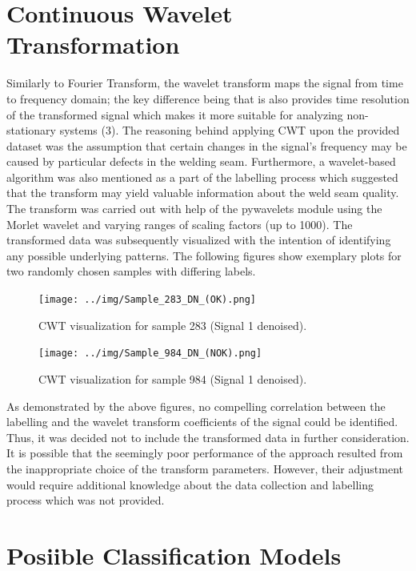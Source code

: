 \documentclass[12pt]{report}
\begin{document}
\section{Continuous Wavelet Transformation}
Similarly to Fourier Transform, the wavelet transform maps the signal from time to frequency domain; the key difference being that is also provides time resolution of the transformed signal which makes it more suitable for analyzing non-stationary systems (3). The reasoning behind applying CWT upon the provided dataset was the assumption that certain changes in the signal’s frequency may be caused by particular defects in the welding seam. Furthermore, a wavelet-based algorithm was also mentioned as a part of the labelling process which suggested that the transform may yield valuable information about the weld seam quality.
The transform was carried out with help of the pywavelets module using the Morlet wavelet and varying ranges of scaling factors (up to 1000). The transformed data was subsequently visualized with the intention of identifying any possible underlying patterns. The following figures show exemplary plots for two randomly chosen samples with differing labels.
\begin{figure}[H]
	\texttt{[image: ../img/Sample\_283\_DN\_(OK).png]}
	\caption{CWT visualization for sample 283 (Signal 1 denoised).}
	\label{fig:CWT1}
\end{figure}
\begin{figure}[H]
	\texttt{[image: ../img/Sample\_984\_DN\_(NOK).png]}
	\caption{CWT visualization for sample 984 (Signal 1 denoised).}
	\label{fig:CW2}
\end{figure}
As demonstrated by the above figures, no compelling correlation between the labelling and the wavelet transform coefficients of the signal could be identified. Thus, it was decided not to include the transformed data in further consideration. It is possible that the seemingly poor performance of the approach resulted from the inappropriate choice of the transform parameters. However, their adjustment would require additional knowledge about the data collection and labelling process which was not provided.


\section{Posiible Classification Models} 
\end{document}
